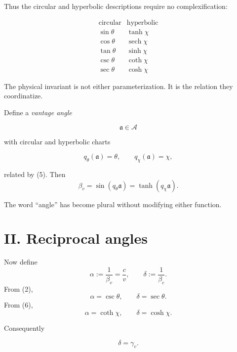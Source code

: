 \documentclass[9pt,twocolumn]{article}
\begin{document}
Thus the circular and hyperbolic descriptions require no complexification:

\begin{equation*}
\begin{array}{c|c}
\text{circular} & \text{hyperbolic}\\ \hline
\sin\theta & \tanh\chi\\
\cos\theta & \operatorname{sech}\chi\\
\tan\theta & \sinh\chi\\
\csc\theta & \coth\chi\\
\sec\theta & \cosh\chi
\end{array}
\tag{6}
\end{equation*}

The physical invariant is not either parameterization. It is the relation they coordinatize.

Define a \emph{vantage angle}

$$
\mathfrak a\in\mathcal A
$$

with circular and hyperbolic charts

$$
q_\theta(\mathfrak a)=\theta,
\qquad
q_\chi(\mathfrak a)=\chi,
$$

related by (5). Then
\begin{equation}
\beta_v
=\sin(q_\theta\mathfrak a)
=\tanh(q_\chi\mathfrak a).
\tag{7}
\end{equation}

The word ``angle'' has become plural without modifying either function.

\section*{II. Reciprocal angles}

Now define
\begin{equation}
\alpha:=\frac1{\beta_v}=\frac{c}{v},
\qquad
\delta:=\frac1{\beta_c}.
\tag{8}
\end{equation}
From (2),
\begin{equation}
\boxed{
\alpha=\csc\theta,\qquad
\delta=\sec\theta.
}
\tag{9}
\end{equation}
From (6),
\begin{equation}
\boxed{
\alpha=\coth\chi,\qquad
\delta=\cosh\chi.
}
\tag{10}
\end{equation}

Consequently

\begin{equation*}
\delta=\gamma_v.
\tag{11}
\end{equation*}
\end{document}
